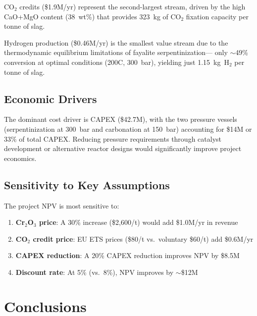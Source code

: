 \documentclass[11pt,a4paper]{article}
\begin{document}
CO$_2$ credits (\$1.9M/yr) represent the second-largest stream, driven by the
high CaO+MgO content (38~wt\%) that provides \SI{323}{kg} of CO$_2$ fixation
capacity per tonne of slag.

Hydrogen production (\$0.46M/yr) is the smallest value stream due to the
thermodynamic equilibrium limitations of fayalite serpentinization---
only $\sim$49\% conversion at optimal conditions (200\textdegree C, 300~bar),
yielding just \SI{1.15}{kg}~H$_2$ per tonne of slag.

\subsection{Economic Drivers}

The dominant cost driver is CAPEX (\$42.7M), with the two pressure vessels
(serpentinization at 300~bar and carbonation at 150~bar) accounting for
\$14M or 33\% of total CAPEX. Reducing pressure requirements through
catalyst development or alternative reactor designs would significantly
improve project economics.

\subsection{Sensitivity to Key Assumptions}

The project NPV is most sensitive to:
\begin{enumerate}[nosep]
  \item \textbf{Cr$_2$O$_3$ price}: A 30\% increase (\$2{,}600/t) would add \$1.0M/yr in revenue
  \item \textbf{CO$_2$ credit price}: EU ETS prices (\$80/t vs.\ voluntary \$60/t) add \$0.6M/yr
  \item \textbf{CAPEX reduction}: A 20\% CAPEX reduction improves NPV by \$8.5M
  \item \textbf{Discount rate}: At 5\% (vs.\ 8\%), NPV improves by $\sim$\$12M
\end{enumerate}

\section{Conclusions}
\end{document}
